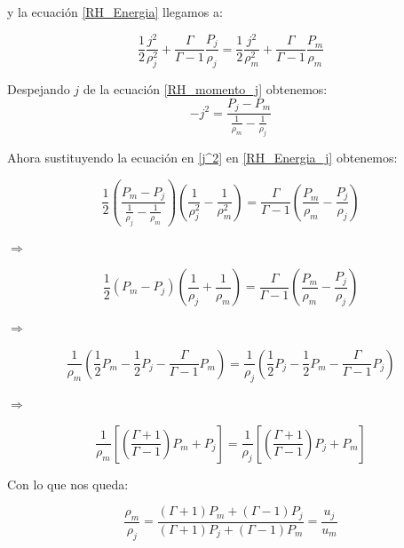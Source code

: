 \documentclass[12pt,a4paper]{book}
\begin{document}
y la ecuación \ref{RH_Energia} llegamos a:

\begin{equation}\label{RH_Energia_j}
\frac{1}{2} \frac{j^{2}}{\rho_{j}^2}+\frac{\Gamma}{\Gamma-1} \frac{P_{j}}{\rho_{j}}=
\frac{1}{2} \frac{j^{2}}{\rho_{m}^2}+\frac{\Gamma}{\Gamma-1} \frac{P_{m}}{\rho_{m}}
\end{equation}

Despejando $j$ de la ecuación \ref{RH_momento_j} obtenemos:
\begin{equation}\label{j^2}
-j^{2}=\frac{P_{j}-P_{m}}{\frac{1}{\rho_{m}}-\frac{1}{\rho_{j}}}
\end{equation}

Ahora sustituyendo la ecuación en \ref{j^2} en \ref{RH_Energia_j} obtenemos:

\begin{equation*}
\frac{1}{2} \left( \frac{P_{m}-P_{j}}{\frac{1}{\rho_{j}}-\frac{1}{\rho_{m}}} \right)
\left(\frac{1}{\rho_{j}^{2}}-\frac{1}{\rho_{m}^{2}} \right)
=
\frac{\Gamma}{\Gamma-1}
\left( \frac{P_{m}}{\rho_{m}}-\frac{P_{j}}{\rho_{j}} \right)
\end{equation*}

$\Rightarrow$

\begin{equation*}
\frac{1}{2}	\left( P_{m} - P_{j} \right)
\left( \frac{1}{\rho_{j}}+\frac{1}{\rho_{m}} \right)
=
\frac{\Gamma}{\Gamma-1}
\left( \frac{P_{m}}{\rho_{m}}-\frac{P_{j}}{\rho_{j}} \right)
\end{equation*}

$\Rightarrow$

\begin{equation*}
\frac{1}{\rho_{m}} \left( \frac{1}{2} P_{m}- \frac{1}{2} P_{j}-
\frac{\Gamma}{\Gamma-1} P_{m} \right)
=
\frac{1}{\rho_{j}} \left( \frac{1}{2} P_{j}- \frac{1}{2} P_{m}-
\frac{\Gamma}{\Gamma-1} P_{j} \right)
\end{equation*}

$\Rightarrow$

\begin{equation*}
\frac{1}{\rho_{m}} \left[  \left(\frac{\Gamma + 1}{\Gamma - 1} \right) P_{m} + P_{j} \right]
=
\frac{1}{\rho_{j}} \left[  \left(\frac{\Gamma + 1}{\Gamma - 1} \right) P_{j} + P_{m} \right]
\end{equation*}

Con lo que nos queda:

\begin{equation}\label{RH_no_rel_choque_no_fuerte}
\frac{\rho_{m}}{\rho_j} =
\frac{\left( \Gamma +1 \right) P_{m}+ \left( \Gamma -1 \right) P_{j
}}{\left(\Gamma +1 \right) P_{j}+ \left( \Gamma -1 \right) P_{m}}
= \frac{u_j}{u_m}
\end{equation}
\end{document}
